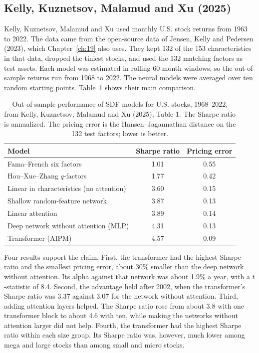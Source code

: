 \subsection{Kelly, Kuznetsov, Malamud and Xu (2025)}

Kelly, Kuznetsov, Malamud and Xu used monthly U.S. stock returns from 1963 to 2022. The data came from the open-source data of Jensen, Kelly and Pedersen (2023), which Chapter~\ref{ch:19} also uses. They kept 132 of the 153 characteristics in that data, dropped the tiniest stocks, and used the 132 matching factors as test assets. Each model was estimated in rolling 60-month windows, so the out-of-sample returns run from 1968 to 2022. The neural models were averaged over ten random starting points. Table~\ref{tab:22-aipm} shows their main comparison.

\begin{table}[htbp]
\centering
\small
\caption{Out-of-sample performance of SDF models for U.S. stocks, 1968--2022, from Kelly, Kuznetsov, Malamud and Xu (2025), Table 1. The Sharpe ratio is annualized. The pricing error is the Hansen--Jagannathan distance on the 132 test factors; lower is better.}
\label{tab:22-aipm}
\begin{tabular}{@{}lcc@{}}
\toprule
Model & Sharpe ratio & Pricing error \\
\midrule
Fama--French six factors & 1.01 & 0.55 \\
Hou--Xue--Zhang $q$-factors & 1.77 & 0.42 \\
Linear in characteristics (no attention) & 3.60 & 0.15 \\
Shallow random-feature network & 3.87 & 0.13 \\
Linear attention & 3.89 & 0.14 \\
Deep network without attention (MLP) & 4.31 & 0.13 \\
Transformer (AIPM) & 4.57 & 0.09 \\
\bottomrule
\end{tabular}
\end{table}

Four results support the claim. First, the transformer had the highest Sharpe ratio and the smallest pricing error, about 30\% smaller than the deep network without attention. Its alpha against that network was about 1.9\% a year, with a $t$-statistic of 8.4. Second, the advantage held after 2002, when the transformer's Sharpe ratio was 3.37 against 3.07 for the network without attention. Third, adding attention layers helped. The Sharpe ratio rose from about 3.8 with one transformer block to about 4.6 with ten, while making the networks without attention larger did not help. Fourth, the transformer had the highest Sharpe ratio within each size group. Its Sharpe ratio was, however, much lower among mega and large stocks than among small and micro stocks.

